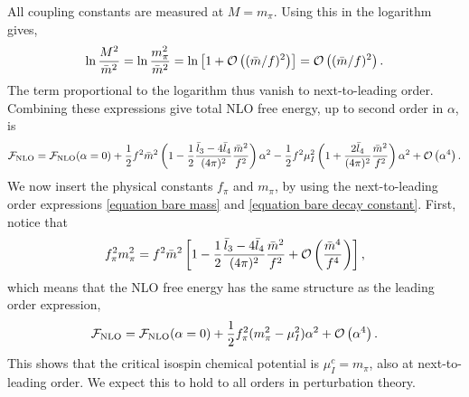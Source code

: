 All coupling constants are measured at $M = m_\pi$.
Using this in the logarithm gives,
\begin{equation}
    \ln \frac{M^2}{\bar m^2}
    = \ln \frac{m_\pi^2}{\bar m^2}
    = \ln \left[1 + \Oh[2]{(\bar m/f)} \right]
    = \Oh[2]{(\bar m/f)}.
\end{equation}
The term proportional to the logarithm thus vanish to next-to-leading order.
Combining these expressions give total NLO free energy, up to second order in $\alpha$, is
\begin{equation}
    \Ef_{\mathrm{NLO}}
    =
    \Ef_{\mathrm{NLO}}(\alpha = 0)
    +
    \frac{1}{2} f^2 \bar m^2
    \left(
        1
        -
        \frac{1}{2}
        \frac{\bar l_3 - 4 \bar l_4}{(4 \pi)^2} \frac{\bar m^2}{f^2}
    \right)\alpha^2
    - \frac{1}{2}f^2 \mu_I^2
    \left(
        1
        +
        \frac{2 \bar l_4}{(4 \pi)^2}
        \frac{\bar m^2}{f^2}
    \right) \alpha^2
    + \Oh[4]{\alpha}.
\end{equation}
We now insert the physical constants $f_\pi$ and $m_\pi$, by using the next-to-leading order expressions \cref{equation bare mass} and \cref{equation bare decay constant}.
First, notice that
\begin{equation}
    f_\pi^2 m_\pi^2
    = f^2 \bar m^2
    \left[
        1 - \frac{1}{2} \frac{\bar l_3 - 4 \bar l_4}{(4 \pi)^2} \frac{\bar m^2}{f^2}
        +
        \Oh[]{\frac{\bar m^4}{f^4}}
    \right],
\end{equation}
which means that the NLO free energy has the same structure as the leading order expression,
\begin{equation}
    \Ef_{\mathrm{NLO}}
    =
    \Ef_{\mathrm{NLO}}(\alpha = 0)
    + \frac{1}{2}f_\pi^2 (m_\pi^2 - \mu_I^2 )\alpha^2
    + \Oh[4]{\alpha}.
\end{equation}
This shows that the critical isospin chemical potential is $\mu_I^c = m_\pi$, also at next-to-leading order.
We expect this to hold to all orders in perturbation theory.
